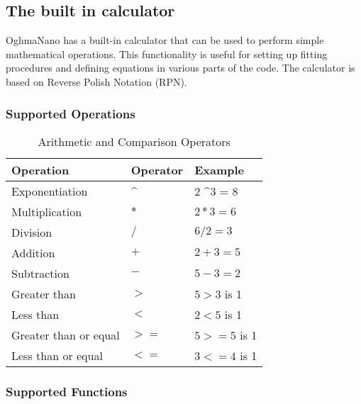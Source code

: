 \newpage
\subsection{The built in calculator}
\label{sec:calcualtor}

OghmaNano has a built-in calculator that can be used to perform simple mathematical operations. This functionality is useful for setting up fitting procedures and defining equations in various parts of the code. The calculator is based on Reverse Polish Notation (RPN).

\subsubsection{Supported Operations}

\begin{table}[h]
    \centering
    \begin{tabular}{|l|l|l|}
        \hline
        \textbf{Operation} & \textbf{Operator} & \textbf{Example} \\
        \hline
        Exponentiation & \textasciicircum & 2 \textasciicircum 3 = 8 \\
        Multiplication & $*$ & $2 * 3 = 6$ \\
        Division & $/$ & $6 / 2 = 3$ \\
        Addition & $+$ & $2 + 3 = 5$ \\
        Subtraction & $-$ & $5 - 3 = 2$ \\
        Greater than & $>$ & $5 > 3$ is 1 \\
        Less than & $<$ & $2 < 5$ is 1 \\
        Greater than or equal & $>=$ & $5 >= 5$ is 1 \\
        Less than or equal & $<=$ & $3 <= 4$ is 1 \\
        \hline
    \end{tabular}
    \caption{Arithmetic and Comparison Operators}
\end{table}

\subsubsection{Supported Functions}

